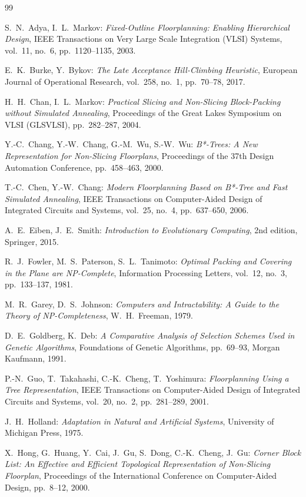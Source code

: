 \begin{thebibliography}{99}

S.~N.~Adya, I.~L.~Markov:
{\em Fixed-Outline Floorplanning: Enabling Hierarchical Design},
IEEE Transactions on Very Large Scale Integration (VLSI) Systems, vol.~11, no.~6, pp.~1120--1135,
2003.

E.~K.~Burke, Y.~Bykov:
{\em The Late Acceptance Hill-Climbing Heuristic},
European Journal of Operational Research, vol.~258, no.~1, pp.~70--78,
2017.

H.~H.~Chan, I.~L.~Markov:
{\em Practical Slicing and Non-Slicing Block-Packing without Simulated Annealing},
Proceedings of the Great Lakes Symposium on VLSI (GLSVLSI), pp.~282--287,
2004.

Y.-C.~Chang, Y.-W.~Chang, G.-M.~Wu, S.-W.~Wu:
{\em B*-Trees: A New Representation for Non-Slicing Floorplans},
Proceedings of the 37th Design Automation Conference, pp.~458--463,
2000.

T.-C.~Chen, Y.-W.~Chang:
{\em Modern Floorplanning Based on B*-Tree and Fast Simulated Annealing},
IEEE Transactions on Computer-Aided Design of Integrated Circuits and Systems, vol.~25, no.~4, pp.~637--650,
2006.

A.~E.~Eiben, J.~E.~Smith:
{\em Introduction to Evolutionary Computing}, 2nd edition,
Springer,
2015.

R.~J.~Fowler, M.~S.~Paterson, S.~L.~Tanimoto:
{\em Optimal Packing and Covering in the Plane are NP-Complete},
Information Processing Letters, vol.~12, no.~3, pp.~133--137,
1981.

M.~R.~Garey, D.~S.~Johnson:
{\em Computers and Intractability: A Guide to the Theory of NP-Completeness},
W.~H.~Freeman,
1979.

D.~E.~Goldberg, K.~Deb:
{\em A Comparative Analysis of Selection Schemes Used in Genetic Algorithms},
Foundations of Genetic Algorithms, pp.~69--93, Morgan Kaufmann,
1991.

P.-N.~Guo, T.~Takahashi, C.-K.~Cheng, T.~Yoshimura:
{\em Floorplanning Using a Tree Representation},
IEEE Transactions on Computer-Aided Design of Integrated Circuits and Systems, vol.~20, no.~2, pp.~281--289,
2001.

J.~H.~Holland:
{\em Adaptation in Natural and Artificial Systems},
University of Michigan Press,
1975.

X.~Hong, G.~Huang, Y.~Cai, J.~Gu, S.~Dong, C.-K.~Cheng, J.~Gu:
{\em Corner Block List: An Effective and Efficient Topological Representation of Non-Slicing Floorplan},
Proceedings of the International Conference on Computer-Aided Design, pp.~8--12,
2000.


\end{thebibliography}
